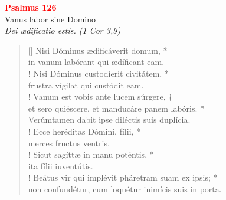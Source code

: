 


\def\greinitialformat#1{%
{\fontsize{39}{39}\selectfont #1}%
}




\vspace{0.3cm}
\begin{center}
 \textcolor{red}{\large \bf Psalmus 126}\\
Vanus labor sine Domino\\
\textit{\small Dei ædificatio estis. (1 Cor 3,9)}
\end{center}
\begin{verse}[\versewidth]
Nisi Dóminus ædificáverit domum, *\\
in vanum labórant qui ædíficant eam.\\!
\vin Nisi Dóminus custodíerit civitátem, *\\
\vin frustra vígilat qui custódit eam.\\!
Vanum est vobis ante lucem súrgere, †\\
et sero quiéscere, et manducáre panem labóris. *\\
Verúmtamen dabit ipse diléctis suis duplícia.\\!
\vin Ecce heréditas Dómini, fílii, *\\
\vin merces fructus ventris.\\!
Sicut sagíttæ in manu poténtis, *\\
ita fílii iuventútis.\\!
\vin Beátus vir qui implévit pháretram suam ex ipsis; *\\
\vin non confundétur, cum loquétur inimícis suis in porta.\\
\end{verse}
\vspace{1cm}


